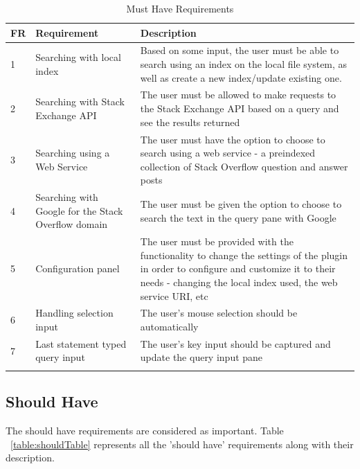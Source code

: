 \documentclass{l4proj}
\begin{document}
\begingroup
\renewcommand\arraystretch{1.5}
\begin{longtable}{p{2cm}p{4cm}p{9cm}}
\caption{Must Have Requirements}\\

\hline

FR & Requirement & Description \\
\hline
1 & Searching with local index & Based on some input, the user must be able to search using an index on the local file system, as well as create a new index/update existing one.\\
2 & Searching with Stack Exchange API & The user must be allowed to make requests to the Stack Exchange API based on a query and see the results returned\\
3 & Searching using a Web Service & The user must have the option to choose to search using a web service - a preindexed collection of Stack Overflow question and answer posts\\
4 & Searching with Google for the Stack Overflow domain & The user must be given the option to choose to search the text in the query pane with Google\\
5 & Configuration panel & The user must be provided with the functionality to change the settings of the plugin in order to configure and customize it to their needs - changing the local index used, the web service URI, etc\\
6 & Handling selection input & The user's mouse selection should be automatically\\
7 & Last statement typed query input & The user's key input should be captured and update the query input pane\\

\hline
\label{table:mustTable}
\end{longtable}
\endgroup

\subsection{Should Have}
The should have requirements are considered as important. Table ~\ref{table:shouldTable} represents all the 'should have' requirements along with their description.
\end{document}
